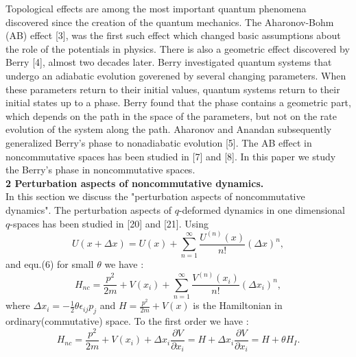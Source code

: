 \documentclass[a4paper,a4paper]{article}
\begin{document}
Topological effects are among the most important quantum phenomena
discovered since the creation of the quantum mechanics. The
Aharonov-Bohm (AB) effect [3], was the first such effect which
changed basic assumptions about the role of the potentials in
physics. There is also a geometric effect discovered by Berry [4],
almost two decades later. Berry investigated quantum systems that
undergo an adiabatic evolution goverened by several changing
parameters. When these parameters return to their initial values,
quantum systems return to their initial states up to a phase.
Berry found that the phase contains a geometric part, which
depends on the path in the space of the parameters, but not on the
rate evolution of the system along the path. Aharonov and Anandan
subsequently generalized Berry's phase to nonadiabatic evolution
[5]. The AB effect in noncommutative spaces has been studied in
[7] and [8]. In this paper we study the Berry's phase in
noncommutative
spaces.\\

\textbf{2 Perturbation aspects of noncommutative dynamics. }\\

In this section we discuss the "perturbation aspects of
noncommutative dynamics". The perturbation aspects of $q$-deformed
dynamics in one dimensional $q$-spaces has been studied in [20]
and [21]. Using
\begin{equation}
U(x+\Delta x)=U(x)+\sum_{n=1}^{\infty}  \frac{U^{(n)}(x)}{n!} (\Delta x)^{n}
,
\end{equation}
and equ.(6) for small $\theta$ we have :
\begin{equation}
H_{nc}=\frac{p^{2}}{2m}+V(x_{i})+\sum_{n=1}^{\infty}
\frac{V^{(n)}(x_{i})}{n!} (\Delta x_{i})^{n} ,
\end{equation}
where $\Delta x_{i}=-\frac{1}{2}\theta \epsilon_{ij}p_{j} $ and
$H=\frac{p^{2}}{2m}+V(x)$ is the Hamiltonian in ordinary(commutative) space.
To the first order we have :
\begin{equation}
H_{nc}=\frac{p^{2}}{2m}+V(x_{i})+\Delta x_{i} \frac{\partial
V}{\partial x_{i}}=H+\Delta x_{i}\frac{\partial
V}{\partial x_{i}}=H+\theta H_{I} .
\end{equation}
\end{document}
